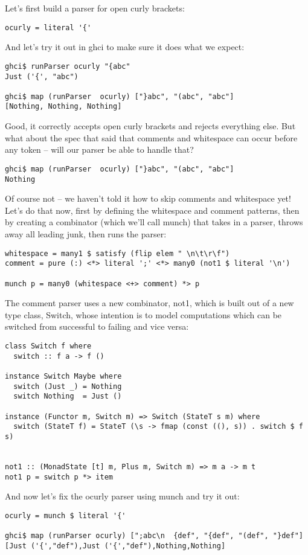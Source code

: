 \documentclass{tmr}
\begin{document}
Let's first build a parser for open curly brackets:
\begin{verbatim}
ocurly = literal '{'
\end{verbatim}
And let's try it out in ghci to make sure it does what we expect:
\begin{verbatim}
ghci$ runParser ocurly "{abc"
Just ('{', "abc")

ghci$ map (runParser  ocurly) ["}abc", "(abc", "abc"]
[Nothing, Nothing, Nothing]
\end{verbatim}
Good, it correctly accepts open curly brackets and rejects everything else.
But what about the spec that said that comments and whitespace can occur 
before any token -- will our parser be able to handle that?
\begin{verbatim}
ghci$ map (runParser  ocurly) ["}abc", "(abc", "abc"]
Nothing
\end{verbatim}
Of course not -- we haven't told it how to skip comments and whitespace yet!
Let's do that now, first by defining the whitespace and comment patterns, then
by creating a combinator (which we'll call munch) that takes in a parser, 
throws away all leading junk, then runs the parser:
\begin{verbatim}
whitespace = many1 $ satisfy (flip elem " \n\t\r\f")
comment = pure (:) <*> literal ';' <*> many0 (not1 $ literal '\n')

munch p = many0 (whitespace <+> comment) *> p
\end{verbatim}
The comment parser uses a new combinator, not1, which is built out of a new type class,
Switch, whose intention is to model computations which can be switched from successful
to failing and vice versa:
\begin{verbatim}
class Switch f where
  switch :: f a -> f ()

instance Switch Maybe where
  switch (Just _) = Nothing
  switch Nothing  = Just ()

instance (Functor m, Switch m) => Switch (StateT s m) where
  switch (StateT f) = StateT (\s -> fmap (const ((), s)) . switch $ f s)


not1 :: (MonadState [t] m, Plus m, Switch m) => m a -> m t
not1 p = switch p *> item
\end{verbatim}
And now let's fix the ocurly parser using munch and try it out:
\begin{verbatim}
ocurly = munch $ literal '{'

ghci$ map (runParser ocurly) [";abc\n  {def", "{def", "(def", "}def"]
[Just ('{',"def"),Just ('{',"def"),Nothing,Nothing]
\end{verbatim}
\end{document}
